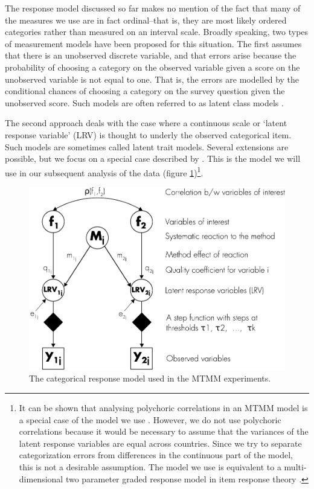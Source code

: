 \documentclass[a4paper,12pt]{article}
\begin{document}
The response model discussed so far makes no mention of the fact that many of the measures we use are in fact ordinal--that is, they are most likely ordered categories rather than measured on an interval scale. 
Broadly speaking, two types of measurement models have been proposed for this situation. The first assumes that there is an unobserved discrete variable, and that errors arise because the probability of choosing a category on the observed variable given a score on the unobserved variable is not equal to one. That is, the errors are modelled by the conditional chances of choosing a category on the survey question given the unobserved score. Such models are often referred to as latent class models \citep{lazarsfeld_latent_1968,hagenaars_applied_2002}.

The second approach deals with the case where a continuous scale or `latent response variable' (LRV) is thought to underly the observed categorical item. Such models are sometimes called latent trait models. Several extensions are possible, but we focus on a special case described by \citet{muthen_general_1984}. This is the model we will use in our subsequent analysis of the data (figure \ref{fig:response_categ})\footnote{It can be shown that analysing polychoric correlations in an MTMM model is a special case of the model we use \citep{muthen_latent_2002}. However, we do not use polychoric correlations because it would be  necessary to assume that the variances of the latent response variables are equal across countries. Since we try to separate categorization errors from differences in the continuous part of the model, this is not a desirable assumption. The model we use is equivalent to a multi-dimensional two parameter graded response model in item response theory \citep{muthen_latent_2002}.}.

\begin{figure}[htb]\centering \includegraphics[width=.7\textwidth]{i/response_model_categorical} \caption{The categorical response model used in the MTMM experiments.\label{fig:response_categ}} \end{figure}
\end{document}
